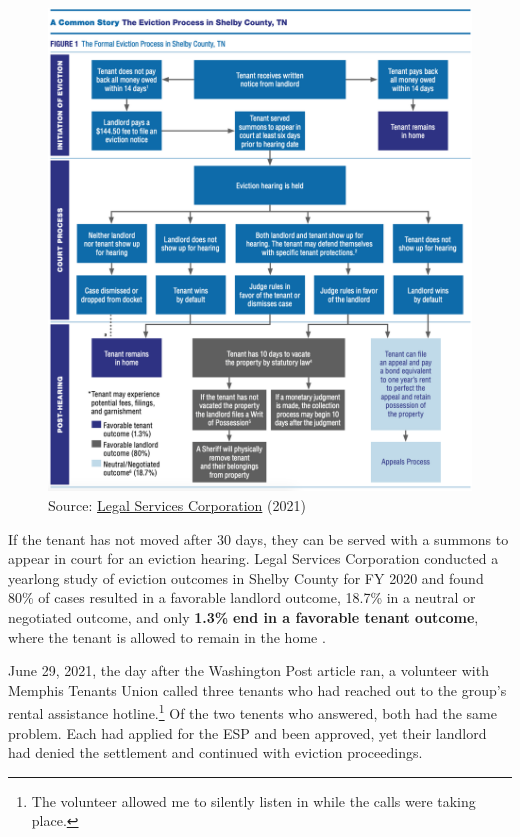 \documentclass[
]{book}
\begin{document}
\begin{figure}
\centering
\includegraphics{_img/LSC-shelby-evict.png}
\caption{Source: \href{https://www.lsc.gov/press-release/new-nationwide-lsc-eviction-study-examines-variations-local-laws-and-highlights}{Legal Services Corporation} (2021)}
\end{figure}

If the tenant has not moved after 30 days, they can be served with a summons to appear in court for an eviction hearing. Legal Services Corporation conducted a yearlong study of eviction outcomes in Shelby County for FY 2020 and found 80\% of cases resulted in a favorable landlord outcome, 18.7\% in a neutral or negotiated outcome, and only \textbf{1.3\%} \textbf{end in a favorable tenant outcome}, where the tenant is allowed to remain in the home \citep{ahmed2021}.

June 29, 2021, the day after the Washington Post article ran, a volunteer with Memphis Tenants Union called three tenants who had reached out to the group's rental assistance hotline.\footnote{The volunteer allowed me to silently listen in while the calls were taking place.} Of the two tenents who answered, both had the same problem. Each had applied for the ESP and been approved, yet their landlord had denied the settlement and continued with eviction proceedings.
\end{document}
